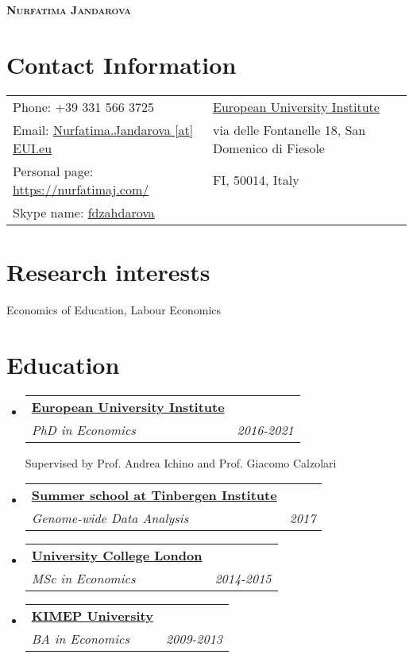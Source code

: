 \documentclass[a4, 11pt]{article}
\makeatletter
\newcommand{\resumeSubheading}[4]{
      \vspace{-2pt}\item
        \begin{tabular*}{0.97\textwidth}[t]{l@{\extracolsep{\fill}}r}
          \textbf{#1} & #2 \\
          \textit{\small#3} & \textit{\small #4} \\
        \end{tabular*}
    }
\newcommand{\resumeSubHeadingListStart}{\begin{itemize}[leftmargin=0.15in, label={}]}
\newcommand{\resumeSubHeadingListEnd}{\end{itemize}}
\makeatother
\begin{document}
    \begin{center}
        \textbf{\Huge \scshape Nurfatima Jandarova} \\ \vspace{1pt}
    \end{center}


    \section*{Contact Information}
    \begin{table}[H]
      \begin{tabular}{>{\raggedright\arraybackslash}p{0.5\linewidth}>{\raggedleft\arraybackslash}p{0.5\linewidth}}Phone: +39 331 566 3725 &\href{https://www.eui.eu/}{European University Institute}\\
          Email: \href{mailto:Nurfatima.Jandarova [at] EUI.eu}{Nurfatima.Jandarova [at] EUI.eu}
        & via delle Fontanelle 18, San Domenico di Fiesole\\
        Personal page: \href{https://nurfatimaj.com/}{https://nurfatimaj.com/} & FI, 50014, Italy\\
        Skype name: \href{skype:fdzahdarova?call}{fdzahdarova} &
      \end{tabular}
    \end{table}

    \section{Research interests}Economics of Education, Labour Economics

    \section{Education}\resumeSubHeadingListStart
          \resumeSubheading
            {\href{https://www.eui.eu}{European University Institute} }
            {}
            {PhD in Economics}
            { 2016-2021 }Supervised by Prof. Andrea Ichino and Prof. Giacomo Calzolari
          \resumeSubheading
            {\href{https://www.tinbergen.nl/home}{Summer school at Tinbergen Institute} }
            {}
            {Genome-wide Data Analysis}
            { 2017 }
          \resumeSubheading
            {\href{https://www.ucl.ac.uk}{University College London} }
            {}
            {MSc in Economics}
            { 2014-2015 }
          \resumeSubheading
            {\href{https://www.kimep.kz/en}{KIMEP University} }
            {}
            {BA in Economics}
            { 2009-2013 }
      \resumeSubHeadingListEnd
\end{document}
